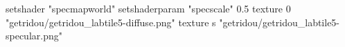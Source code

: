 setshader "specmapworld"
setshaderparam "specscale" 0.5
texture 0 "getridou/getridou_labtile5-diffuse.png"
texture s "getridou/getridou_labtile5-specular.png"